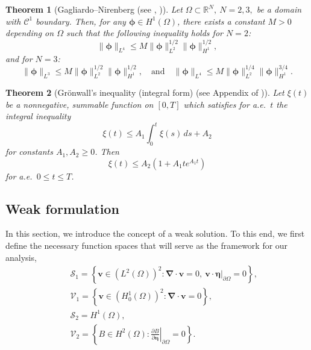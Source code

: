 \documentclass[final,3p,times]{elsarticle}
\theoremstyle{plain}
\newtheorem{theorem}{Theorem}[section]
\theoremstyle{remark}
\theoremstyle{plain}
\theoremstyle{remark}
\begin{document}
\begin{theorem}[Gagliardo–Nirenberg (see \emph{\citep[Lemma 1]{migorski2019nonmonotone}}, \emph{\citep[Lemma 1.1]{ebenbeck2019cahn}})]\label{Th: gagliardo}
Let $\Omega \subset \mathds R^N,\ N = 2,3, $ be a domain with $\mathcal{C}^{1}$ boundary. Then, for any $\boldsymbol{\phi} \in H^{1}(\Omega)$, there exists a constant  $M>0 $ depending on $\Omega$ such that the following inequality holds for $N=2$:
$$
\|\boldsymbol{\phi}\|_{L^{4}} \leq M\|\boldsymbol{\phi}\|_{L^{2}}^{1 / 2}\| \boldsymbol{\phi}\|_{H^{1}}^{1 / 2},
$$
and for $N=3$:
$$
\|\boldsymbol{\phi}\|_{L^{3}} \leq M\|\boldsymbol{\phi}\|_{L^{2}}^{1 / 2}\| \boldsymbol{\phi}\|_{H^{1}}^{1 / 2}, \quad \text{and} \quad \|\boldsymbol{\phi}\|_{L^{4}} \leq M\|\boldsymbol{\phi}\|_{L^{2}}^{1 / 4}\| \boldsymbol{\phi}\|_{H^{1}}^{3 / 4}.
$$
\end{theorem}

\begin{theorem}[{Gr\"onwall’s inequality (integral form)} (see Appendix of \citep{evans2010partial})]\label{Th: gronwall}
Let $\xi(t)$ be a nonnegative, summable function on $[0,T]$ which satisfies for a.e.\ $t$ the integral inequality
\begin{equation*}
\xi(t) \leq A_1 \int_0^t \xi(s)\, ds + A_2
\end{equation*}
for constants $A_1, A_2 \geq 0$. Then
\begin{equation*}
\xi(t) \leq A_2 (1 + A_1 t e^{A_1 t})
\end{equation*}
for a.e.\ $0 \leq t \leq T$.
\end{theorem}

\subsection{Weak formulation\label{subsec:Weak_formulation}}

In this section, we introduce the concept of a weak solution. To this end, we first define the necessary function spaces that will serve as the framework for our analysis,
\begin{eqnarray} 
    & &\mathscr S_1 = \left\{ \mathbf{v} \in \left(L^2(\Omega)\right)^2 : \boldsymbol{\nabla} \cdot \mathbf{v} = 0, \ \left. \mathbf{v} \cdot \boldsymbol{\eta} \right\rvert_{\partial \Omega} = 0 \right\}, \nonumber \\ 
    & & \mathscr V_1 = \left\{\mathbf{v} \in \left(H_0^1\left(\Omega\right)\right)^2:  \boldsymbol{\nabla}\cdot \mathbf{v} = 0 \right\}, \nonumber \\ 
    & &\mathscr S_2=H^1\left(\Omega\right), \nonumber \\ 
    & & \mathscr V_2 = \left\{B \in H^2\left(\Omega\right): \left. \frac{\partial B}{\partial \boldsymbol{\eta}}\right\rvert_{\partial \Omega} = 0 \right\}.\nonumber
\end{eqnarray}
\end{document}
